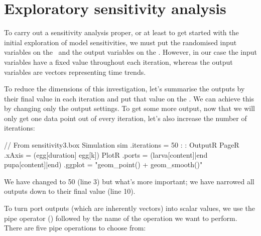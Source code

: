 \section{Exploratory sensitivity analysis}
To carry out a sensitivity analysis proper, or at least to get started with the initial exploration of model sensitivities, we must put the randomised input variables on the \xaxis\ and the  output variables on the \yaxis. However, in our case the input variables have a fixed value throughout each iteration, whereas the output variables are vectors representing  time trends. 

To reduce the dimensions of this investigation, let's summarise the outputs by their final value in each iteration and put that value on the \yaxis. We can achieve this by changing only the output settings. To get some more output, now that we will only get one data point out of every iteration, let's also increase the number of iterations:

\lstset{numbers=left}
\begin{boxscript}
// From sensitivity3.box
Simulation sim {
  .iterations = 50
  :
  :
  OutputR {
    PageR {
      .xAxis = (egg[duration] egg[k])
      PlotR {
        .ports = (larva[content]|end pupa[content]|end)
        .ggplot = "geom_point() + geom_smooth()"
      }
    }
  }
}
\end{boxscript}
\lstset{numbers=none}

We have changed  to 50 (line 3) but what's more important; we have narrowed all outputs down to their final value (line 10). 

To turn port outputs (which are inherently vectors) into scalar values, we use the pipe operator (\code{|}) followed by the name of the operation we want to perform. There are five pipe operations to choose from:
\begin{compactitem}
\item{}
\item{}
\item{}
\item{}
\item{}
\end{compactitem}

